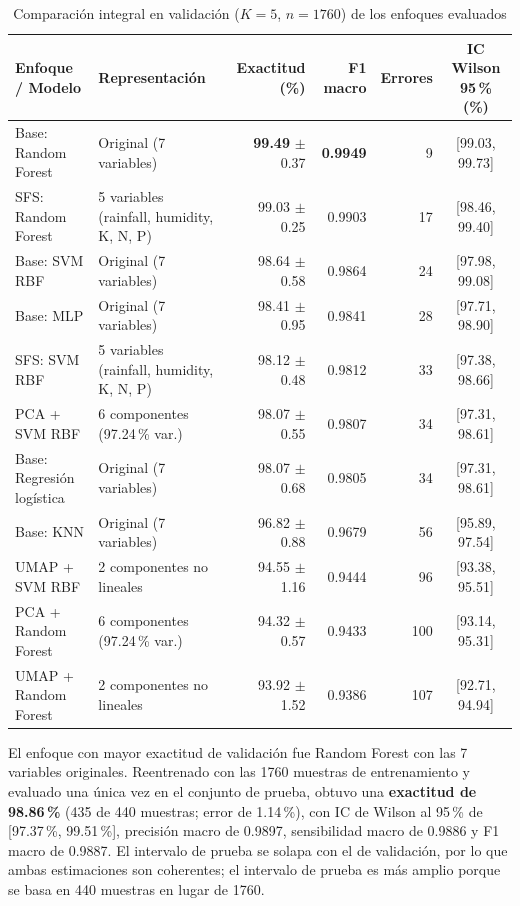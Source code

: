 \documentclass[conference]{IEEEtran}
\begin{document}
\begin{table}[htbp]
\caption{Comparación integral en validación ($K=5$, $n=1760$) de los enfoques evaluados}
\label{tab:comparacion_integral}
\centering
\footnotesize
\setlength{\tabcolsep}{5pt}
\begin{tabular}{llrrrc}
\toprule
\textbf{Enfoque / Modelo} & \textbf{Representación} & \textbf{Exactitud (\%)} & \textbf{F1 macro} & \textbf{Errores} & \textbf{IC Wilson 95\,\% (\%)} \\
\midrule
Base: Random Forest & Original (7 variables) & \textbf{99.49} $\pm$ 0.37 & \textbf{0.9949} & 9 & [99.03, 99.73] \\
SFS: Random Forest & 5 variables (rainfall, humidity, K, N, P) & 99.03 $\pm$ 0.25 & 0.9903 & 17 & [98.46, 99.40] \\
Base: SVM RBF & Original (7 variables) & 98.64 $\pm$ 0.58 & 0.9864 & 24 & [97.98, 99.08] \\
Base: MLP & Original (7 variables) & 98.41 $\pm$ 0.95 & 0.9841 & 28 & [97.71, 98.90] \\
SFS: SVM RBF & 5 variables (rainfall, humidity, K, N, P) & 98.12 $\pm$ 0.48 & 0.9812 & 33 & [97.38, 98.66] \\
PCA + SVM RBF & 6 componentes (97.24\,\% var.) & 98.07 $\pm$ 0.55 & 0.9807 & 34 & [97.31, 98.61] \\
Base: Regresión logística & Original (7 variables) & 98.07 $\pm$ 0.68 & 0.9805 & 34 & [97.31, 98.61] \\
Base: KNN & Original (7 variables) & 96.82 $\pm$ 0.88 & 0.9679 & 56 & [95.89, 97.54] \\
UMAP + SVM RBF & 2 componentes no lineales & 94.55 $\pm$ 1.16 & 0.9444 & 96 & [93.38, 95.51] \\
PCA + Random Forest & 6 componentes (97.24\,\% var.) & 94.32 $\pm$ 0.57 & 0.9433 & 100 & [93.14, 95.31] \\
UMAP + Random Forest & 2 componentes no lineales & 93.92 $\pm$ 1.52 & 0.9386 & 107 & [92.71, 94.94] \\
\bottomrule
\end{tabular}
\end{table}

El enfoque con mayor exactitud de validación fue Random Forest con las 7 variables originales. Reentrenado con las 1760 muestras de entrenamiento y evaluado una única vez en el conjunto de prueba, obtuvo una \textbf{exactitud de 98.86\,\%} (435 de 440 muestras; error de 1.14\,\%), con IC de Wilson al 95\,\% de [97.37\,\%, 99.51\,\%], precisión macro de 0.9897, sensibilidad macro de 0.9886 y F1 macro de 0.9887. El intervalo de prueba se solapa con el de validación, por lo que ambas estimaciones son coherentes; el intervalo de prueba es más amplio porque se basa en 440 muestras en lugar de 1760.
\end{document}
